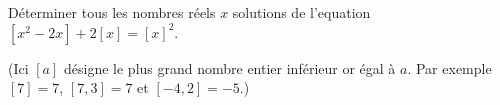 \documentclass[varwidth]{standalone}
\begin{document}
    D\'eterminer tous les nombres r\'eels $x$ solutions de l'equation $[x^2 - 2x] + 2[x] = [x]^2$.

    (Ici $[a]$ d\'esigne le plus grand nombre entier inf\'erieur or \'egal \`a $a$. Par exemple $[7] = 7$, $[7,3] = 7$ et $[-4,2] = -5$.)
\end{document}
